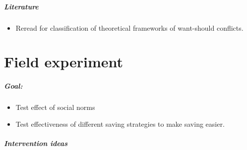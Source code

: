 \documentclass[a4paper, 11pt]{report}
\begin{document}
\paragraph{Literature}
\begin{itemize}
	\item Reread \citet{bitterly2015want} for classification of theoretical frameworks of want-should conflicts.
\end{itemize}



\chapter{Field experiment}


\paragraph{Goal:}
\begin{itemize}
	\item Test effect of social norms
	\item Test effectiveness of different saving strategies to make saving easier.
\end{itemize}


\paragraph{Intervention ideas}
\end{document}
